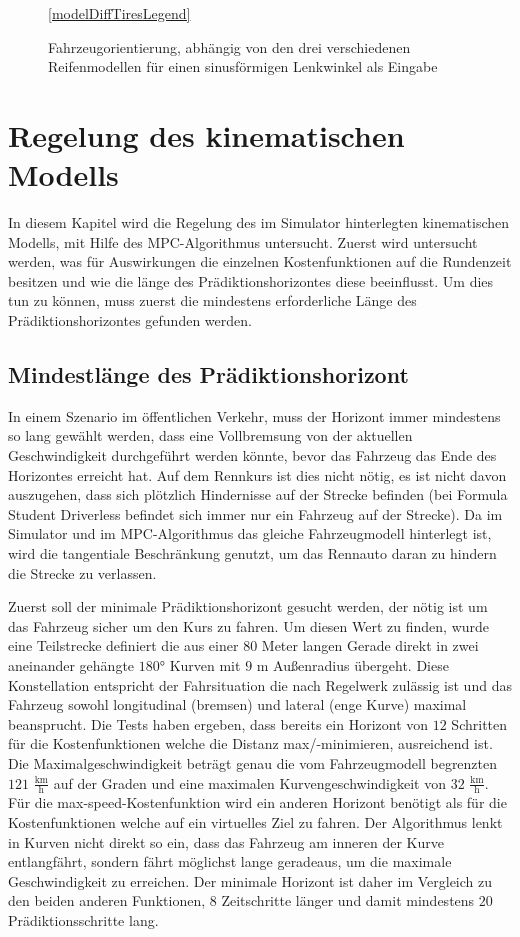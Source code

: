 \documentclass{like}
\begin{document}
\begin{figure}
	\centering
	 
	\ref{modelDiffTiresLegend}
	\caption{Fahrzeugorientierung, abhängig von den drei verschiedenen Reifenmodellen für einen sinusförmigen Lenkwinkel als Eingabe}
	\label{fig:modelDiffTires}
\end{figure}

\newpage
\section{Regelung des kinematischen Modells}
In diesem Kapitel wird die Regelung des im Simulator hinterlegten kinematischen Modells, mit Hilfe des \ac{MPC}-Algorithmus untersucht. Zuerst wird untersucht werden, was für Auswirkungen die einzelnen Kostenfunktionen auf die Rundenzeit besitzen und wie die länge des Prädiktionshorizontes diese beeinflusst.
Um dies tun zu können, muss zuerst die mindestens erforderliche Länge des Prädiktionshorizontes gefunden werden. 

\subsection{Mindestlänge des Prädiktionshorizont} 
In einem Szenario im öffentlichen Verkehr, muss der Horizont immer mindestens so lang gewählt werden, dass eine Vollbremsung von der aktuellen Geschwindigkeit durchgeführt werden könnte, bevor das Fahrzeug das Ende des Horizontes erreicht hat. Auf dem Rennkurs ist dies nicht nötig, es ist nicht davon auszugehen, dass sich plötzlich Hindernisse auf der Strecke befinden (bei Formula Student Driverless befindet sich immer nur ein Fahrzeug auf der Strecke). Da im Simulator und im \ac{MPC}-Algorithmus das gleiche Fahrzeugmodell hinterlegt ist, wird die tangentiale Beschränkung genutzt, um das Rennauto daran zu hindern die Strecke zu verlassen.

Zuerst soll der minimale Prädiktionshorizont gesucht werden, der nötig ist um das Fahrzeug sicher um den Kurs zu fahren. Um diesen Wert zu finden, wurde eine Teilstrecke definiert die aus einer $80$ Meter langen Gerade direkt in zwei aneinander gehängte $180$° Kurven mit $9$ m Außenradius übergeht. Diese Konstellation entspricht der Fahrsituation die nach Regelwerk zulässig ist und das Fahrzeug sowohl longitudinal (bremsen) und lateral (enge Kurve) maximal beansprucht. Die Tests haben ergeben, dass bereits ein Horizont von $12$ Schritten für die Kostenfunktionen welche die Distanz max/-minimieren, ausreichend ist. Die Maximalgeschwindigkeit beträgt genau die vom Fahrzeugmodell begrenzten $121$ $\frac{\text{km}}{\text{h}}$ auf der Graden und eine maximalen Kurvengeschwindigkeit von $32$ $\frac{\text{km}}{\text{h}}$. 
Für die max-speed-Kostenfunktion wird ein anderen Horizont benötigt als für die Kostenfunktionen welche auf ein virtuelles Ziel zu fahren. Der Algorithmus lenkt in Kurven nicht direkt so ein, dass das Fahrzeug am inneren der Kurve entlangfährt, sondern fährt möglichst lange geradeaus, um die maximale Geschwindigkeit zu erreichen. Der minimale Horizont ist daher im Vergleich zu den beiden anderen Funktionen, $8$ Zeitschritte länger und damit mindestens $20$ Prädiktionsschritte lang.
\end{document}
